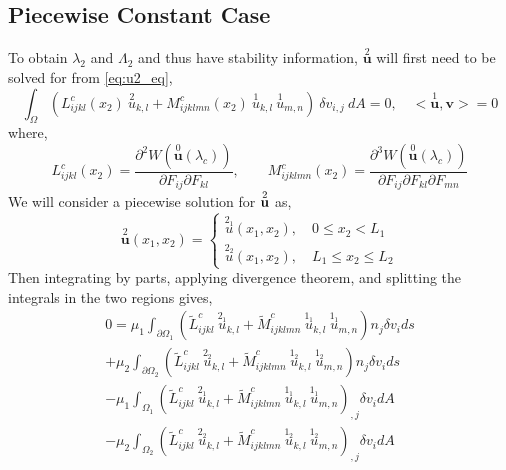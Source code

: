 \documentclass[11pt]{report}
\begin{document}
\begin{appendices}
\section{Piecewise Constant Case}
To obtain $\lambda_2$ and $\Lambda_2$ and thus have stability information, $\overset{2}{\mathbf{u}}$ will first need to be solved for from \eqref{eq:u2_eq},
\begin{equation} \label{eq:u2_eq_2}
\int_\Omega ( L^c_{ijkl}(x_2) \: \overset{2}{u}_{k,l} + M^c_{ijklmn}(x_2) \: \overset{1}{u}_{k,l} \: \overset{1}{u}_{m,n} ) \: \delta v_{i,j} \: dA = 0,  \quad <\overset{1}{\mathbf{u}}, \mathbf{v} > = 0
\end{equation} 
where,
\begin{equation*}
L^c_{ijkl}(x_2) = \frac{\partial^2 W(\overset{0}{\mathbf{u}}(\lambda_c))}{\partial F_{ij} \partial F_{kl}}, \qquad M^c_{ijklmn}(x_2) = \frac{\partial^3 W(\overset{0}{\mathbf{u}}(\lambda_c))}{\partial F_{ij} \partial F_{kl} \partial F_{mn}}
\end{equation*}
We will consider a piecewise solution for $\overset{2}{\bf{u}}$ as,
\begin{equation}
\overset{2}{\mathbf{u}}(x_1, x_2) =
\left \{
\begin{aligned}
  \overset{2_1}{u}(x_1, x_2), \quad  0 \leq x_2 < L_1 \\
  \overset{2_2}{u}(x_1, x_2), \quad  L_1 \leq x_2 \leq L_2
\end{aligned}
\right.
\end{equation}
Then integrating by parts, applying divergence theorem, and splitting the integrals in the two regions gives,
\begin{equation} \label{eq:piece_const_asy_weak}
\begin{split}
0 = \mu_1 \int_{\partial \Omega_1} \left( \tilde{L}^c_{ijkl} \: \overset{2_1}{u}_{k,l} + \tilde{M}^c_{ijklmn}\: \overset{1_1}{u}_{k,l} \: \overset{1_1}{u}_{m,n} \right) n_j \delta v_i ds \\
 + \mu_2 \int_{\partial \Omega_2} \left( \tilde{L}^c_{ijkl} \: \overset{2_2}{u}_{k,l} + \tilde{M}^c_{ijklmn} \: \overset{1_2}{u}_{k,l} \: \overset{1_2}{u}_{m,n} \right) n_j \delta v_i ds \\
 -\mu_1  \int_{\Omega_1} \left( \tilde{L}^c_{ijkl} \: \overset{2_1}{u}_{k,l} + \tilde{M}^c_{ijklmn} \: \overset{1_1}{u}_{k,l} \: \overset{1_1}{u}_{m,n} \right)_{,j} \delta v_i dA \\
  -\mu_2  \int_{\Omega_2} \left( \tilde{L}^c_{ijkl} \: \overset{2_2}{u}_{k,l} + \tilde{M}^c_{ijklmn} \: \overset{1_2}{u}_{k,l} \: \overset{1_2}{u}_{m,n} \right)_{,j} \delta v_i dA

\end{split}
\end{equation}
\end{appendices}
\end{document}
